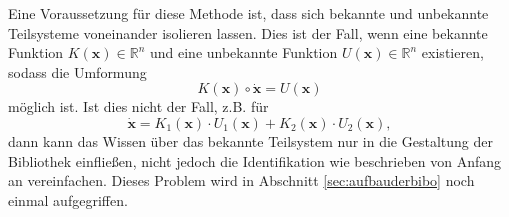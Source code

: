 Eine Voraussetzung für diese Methode ist, dass sich bekannte und unbekannte Teilsysteme voneinander isolieren lassen. Dies ist der Fall, wenn eine bekannte Funktion $K(\boldsymbol{x})\in\mathbb{R}^{n}$ und eine unbekannte Funktion $U(\boldsymbol{x})\in\mathbb{R}^{n}$ existieren, sodass die Umformung
\begin{equation}
 K(\boldsymbol{x}) \circ \dot{\boldsymbol{x}} = U(\boldsymbol{x})
\end{equation} 
möglich ist. Ist dies nicht der Fall, z.B. für
\begin{equation}
\dot{\boldsymbol{x}} = K_1(\boldsymbol{x})\cdot U_1(\boldsymbol{x}) + K_2(\boldsymbol{x})\cdot U_2(\boldsymbol{x}),
\end{equation}
dann kann das Wissen über das bekannte Teilsystem nur in die Gestaltung der Bibliothek einfließen, nicht jedoch die Identifikation wie beschrieben von Anfang an vereinfachen.
Dieses Problem wird in Abschnitt \ref{sec:aufbauderbibo} noch einmal aufgegriffen.








